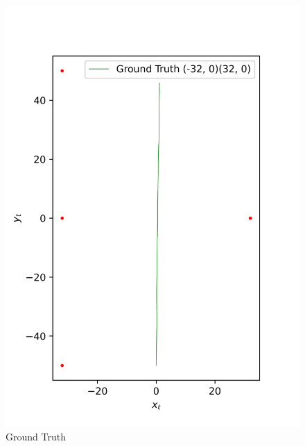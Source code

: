 \begin{figure}[H]
    \centering
    \begin{minipage}{0.49\linewidth}
        \centering
        \includegraphics[width=\linewidth]{plots/part2-f-3-GT.png}
        \caption*{Ground Truth}
    \end{minipage}
    \hfill
    \begin{minipage}{0.49\linewidth}
        \centering

\end{minipage}
\end{figure}
